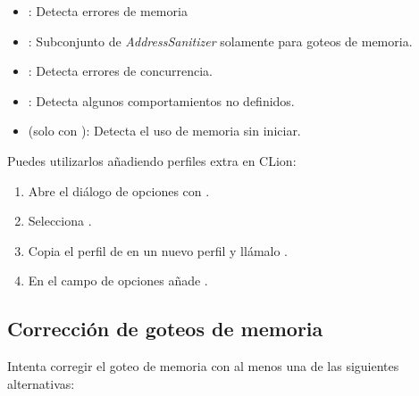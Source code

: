\begin{itemize}
  \item {}: 
        Detecta errores de memoria
  \item {}: 
        Subconjunto de \emph{AddressSanitizer} solamente para goteos de memoria.
  \item {}: 
        Detecta errores de concurrencia.
  \item {}: 
        Detecta algunos comportamientos no definidos.
  \item {} (solo con ): 
        Detecta el uso de memoria sin iniciar.
\end{itemize}

Puedes utilizarlos añadiendo perfiles extra en CLion:

\begin{enumerate}

\item
Abre el diálogo de opciones con .

\item
Selecciona .

\item
Copia el perfil de  en un nuevo perfil 
y llámalo .

\item
En el campo de opciones añade
.

\end{enumerate}

\subsection{Corrección de goteos de memoria}

Intenta corregir el goteo de memoria con al menos una de las siguientes alternativas:


